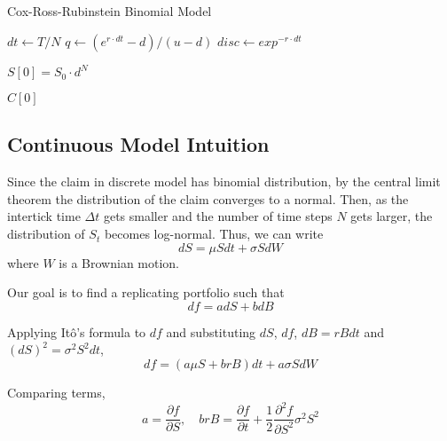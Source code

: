\begin{algorithm}
    \caption{Cox-Ross-Rubinstein Binomial Model}\label{alg:binomial_call}

        \BlankLine
        $dt \gets T/N$\;
        $q \gets (e^{r \cdot dt} - d)/(u-d)$\;
        $disc \gets exp^{-r \cdot dt}$\;

        \BlankLine
        $S[0] = S_0 \cdot d^N$\;

        \BlankLine

        \BlankLine

        \BlankLine
        \Return $C[0]$
\end{algorithm}

\subsection{Continuous Model Intuition}


Since the claim in discrete model has binomial distribution, by the central limit theorem the distribution of the claim converges to a normal. Then, as the intertick time $\Delta t$ gets smaller and the number of time steps $N$ gets larger, the distribution of $S_t$ becomes log-normal. Thus, we can write
\[
    dS = \mu S dt + \sigma S dW
\]
where $W$ is a Brownian motion. 

Our goal is to find a replicating portfolio such that 
\[
    df = a dS + b dB
\]

Applying Itô's formula to $df$ and substituting $dS$, $df$, $dB = rBdt$ and $(dS)^2 = \sigma^2 S^2 dt$, 
\[
    df = (a \mu S + brB) dt + a \sigma S dW
\]

Comparing terms,
\[
    a = \frac{\partial f}{\partial S}, \quad brB = \frac{\partial f}{\partial t} + \frac{1}{2} \frac{\partial^2 f}{\partial S^2} \sigma^2 S^2
\]

